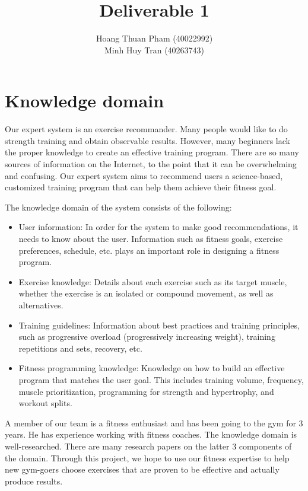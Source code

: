 \documentclass{article}      %
\title{Deliverable 1}  %
\author{Hoang Thuan Pham (40022992) \\ Minh Huy Tran (40263743)}      %
\begin{document}

\maketitle                   %

\section{Knowledge domain}

Our expert system is an exercise recommander. Many people would like to do strength training and obtain observable results. However, many beginners lack the proper knowledge to create an effective training program. There are so many sources of information on the Internet, to the point that it can be overwhelming and confusing. Our expert system aims to recommend users a science-based, customized training program that can help them achieve their fitness goal.

The knowledge domain of the system consists of the following:

\begin{itemize}
    \item User information: In order for the system to make good recommendations, it needs to know about the user. Information such as fitness goals, exercise preferences, schedule, etc. plays an important role in designing a fitness program.
    \item Exercise knowledge: Details about each exercise such as its target muscle, whether the exercise is an isolated or compound movement, as well as alternatives.
    \item Training guidelines: Information about best practices and training principles, such as progressive overload (progressively increasing weight), training repetitions and sets, recovery, etc.
    \item Fitness programming knowledge: Knowledge on how to build an effective program that matches the user goal. This includes training volume, frequency, muscle prioritization, programming for strength and hypertrophy, and workout splits.
\end{itemize}

A member of our team is a fitness enthusiast and has been going to the gym for 3 years. He has experience working with fitness coaches. The knowledge domain is well-researched. There are many research papers on the latter 3 components of the domain. Through this project, we hope to use our fitness expertise to help new gym-goers choose exercises that are proven to be effective and actually produce results.
\end{document}
